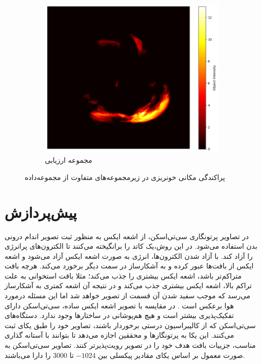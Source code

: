 \begin{figure}[h!]
    \begin{subfigure}{0.33\textwidth}
        \includegraphics[width=\linewidth]{Images/chapter2/test_heatmap.png}
        \caption{مجموعه ارزیابی}
        \label{fig:test}
    \end{subfigure}

    \caption{پراکندگی مکانی خونریزی در زیرمجموعه‌های متفاوت از مجموعه‌داده}
    \label{fig:heatmaps}
\end{figure}


\section{پیش‌پردازش\protect{}}

در تصاویر پرتونگاری سی‌تی‌اسکن، از اشعه ایکس
 به منظور ثبت تصویر اندام درونی بدن استفاده می‌شود. در این روش،‌یک کاتد
را برانگیخته می‌کنند تا الکترون‌های
 پرانرژی را آزاد ‌کند. با آزاد شدن الکترون‌ها، انرژی به صورت اشعه ایکس آزاد می‌شود و اشعه ایکس از بافت‌ها عبور کرده و به آشکارساز در سمت دیگر برخورد می‌کند. هرچه بافت متراکم‌تر باشد، اشعه ایکس بیشتری را جذب می‌کند؛ مثلا باقت استخوانی به علت تراکم بالا،‌ اشعه ایکس بیشتری جذب می‌کند و در نتیجه آن اشعه کمتری به آشکارساز می‌رسد که موجب سفید شدن آن قسمت از تصویر خواهد شد اما این مسئله درمورد هوا برعکس است
 \cite{kaggleCTScansDICOM}.
در مقایسه با تصویر اشعه ایکس ساده، سی‌تی‌اسکن دارای تفکیک‌پذیری بیشتر است و هیچ هم‌پوشانی در ساختارها وجود ندارد.
دستگاه‌های سی‌تی‌اسکن که از کالیبراسیون
 درستی برخوردار باشند، تصاویر خود را طبق یکای 
ثبت می‌کنند. این یکا به پرتونگارها و محققین اجازه می‌دهد تا بتوانند با آستانه گذاری مناسب، جزییات بافت هدف خود را در تصویر رویت‌پذیرتر کنند. تصاویر سی‌تی‌اسکن به صورت معمول بر اساس یکای
 مقادیر پیکسلی بین $-1024$ تا 3000 را دارا می‌باشند.

